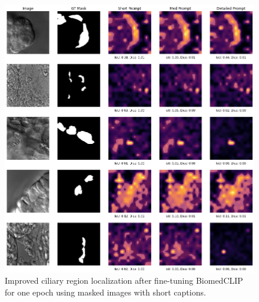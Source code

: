 \documentclass[./dissertation.tex]{subfiles}
\begin{document}
\begin{figure}
  \centering
  \includegraphics[width=\textwidth]{figures/sam/fine-tuned 1ep with mask short caption th 0.4.png}
  \caption{Improved ciliary region localization after fine-tuning BiomedCLIP for one epoch using masked images with short captions.}
  \label{fig:fine_tuned_mask_short_ep1}
\end{figure}
\end{document}
